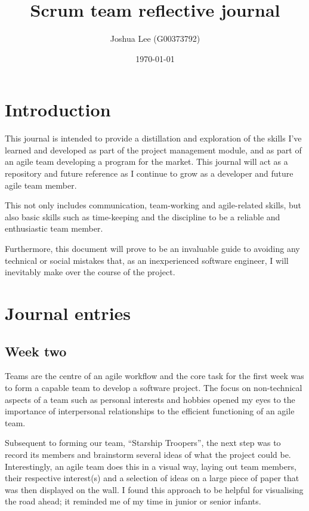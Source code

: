 \documentclass[12pt, a4]{article}
\title{Scrum team reflective journal}
\author{Joshua Lee (G00373792)}
\date{\today}
\begin{document}
\begin{titlepage}
\maketitle
\tableofcontents
\end{titlepage}

\section{Introduction}
This journal is intended to provide a distillation and exploration of the skills
I've learned and developed as part of the project management module, and as part
of an agile team developing a program for the market. This journal will act as
a repository and future reference as I continue to grow as a developer and future
agile team member.

This not only includes communication, team-working and agile-related skills, but
also basic skills such as time-keeping and the discipline to be a reliable and
enthusiastic team member.

Furthermore, this document will prove to be an invaluable guide to avoiding any
technical or social mistakes that, as an inexperienced software engineer, I will
inevitably make over the course of the project.

\section{Journal entries}
\subsection{Week two}
Teams are the centre of an agile workflow and the core task for the first week
was to form a capable team to develop a software project. The focus on
non-technical aspects of a team such as personal interests and hobbies opened
my eyes to the importance of interpersonal relationships to the efficient
functioning of an agile team.

Subsequent to forming our team, ``Starship Troopers'', the next step was to
record its members and brainstorm several ideas of what the project could be.
Interestingly, an agile team does this in a visual way, laying out team members,
their respective interest(s) and a selection of ideas on a large piece of paper
that was then displayed on the wall. I found this approach to be helpful for
visualising the road ahead; it reminded me of my time in junior or
senior infants.
\end{document}
